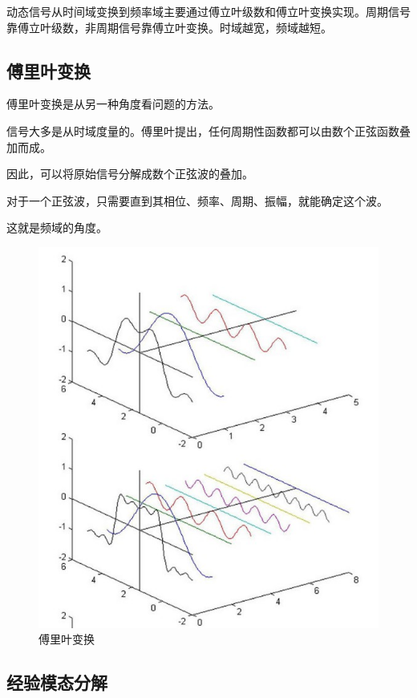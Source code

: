 \documentclass[cs4size,a4paper]{ctexart}
\numberwithin{equation}{section}
\numberwithin{table}{section}
\numberwithin{figure}{section}
\begin{document}
动态信号从时间域变换到频率域主要通过傅立叶级数和傅立叶变换实现。周期信号靠傅立叶级数，非周期信号靠傅立叶变换。时域越宽，频域越短。

\subsection{傅里叶变换}

傅里叶变换是从另一种角度看问题的方法。

信号大多是从时域度量的。傅里叶提出，任何周期性函数都可以由数个正弦函数叠加而成。

因此，可以将原始信号分解成数个正弦波的叠加。

对于一个正弦波，只需要直到其相位、频率、周期、振幅，就能确定这个波。

这就是频域的角度。

\begin{figure}[H]
\small
\centering
\includegraphics{傅里叶变换.jpg}
\caption{傅里叶变换} \label{fig:傅里叶变换}
\end{figure}

\subsection{经验模态分解}
\end{document}
